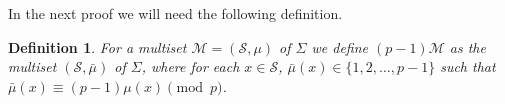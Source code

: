 \documentclass[12pt]{article}
\newcommand{\cC}{{\mathcal C}}
\newcommand{\cM}{{\mathcal M}}
\newcommand{\cS}{{\mathcal S}}
\newtheorem{definition}[theorem]{Definition}
\DeclareMathOperator{\PG}{{PG}}
\DeclareMathOperator{\AG}{{AG}}
\begin{document}
	
	In the next proof we will need the following definition.
	
	\begin{definition}
		For a multiset $\cM=(\cS,\mu)$ of $\Sigma$ we define $(p-1)\cM$ as the multiset $(\cS,\bar{\mu})$ of $\Sigma$, where
		for each $x\in \cS$, $\bar{\mu}(x) \in \{1,2,\ldots,p-1\}$ such that $\bar{\mu}(x) \equiv (p-1)\mu(x) \pmod p$. 
	\end{definition}
	
\end{document}
